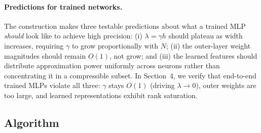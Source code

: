 \documentclass{article}
\begin{document}
\begin{table}[t]
\centering
\caption{Comparison of parameter count, working-precision bit complexity, and weight magnitudes for prior MLP constructions on analytic targets.}
\label{tab:comparison}
\small
\setlength{\tabcolsep}{4pt}
\end{table}

\paragraph{Predictions for trained networks.}
The construction makes three testable predictions about what a trained MLP \emph{should} look like to achieve high precision: (i) \(\lambda = \gamma h\) should plateau as width increases, requiring \(\gamma\) to grow proportionally with \(N\); (ii) the outer-layer weight magnitudes should remain \(O(1)\), not grow; and (iii) the learned features should distribute approximation power uniformly across neurons rather than concentrating it in a compressible subset. In Section~4, we verify that end-to-end trained MLPs violate all three: \(\gamma\) stays \(O(1)\) (driving \(\lambda \to 0\)), outer weights are too large, and learned representations exhibit rank saturation.

\subsection{Algorithm}
\label{subsec:qi-algorithm}
\end{document}
